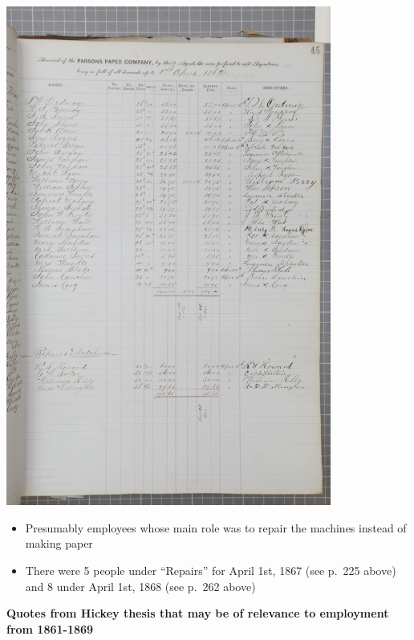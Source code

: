 \documentclass[
  letterpaper,
  DIV=11,
  numbers=noendperiod]{scrartcl}
\begin{document}
\begin{itemize}
  \includegraphics[width=4.20833in,height=\textheight]{images/Screenshot 2023-02-13 at 4.18.46 PM.png}

  \begin{itemize}
  \item
    Presumably employees whose main role was to repair the machines
    instead of making paper
  \item
    There were 5 people under ``Repairs'' for April 1st, 1867 (see
    p.~225 above) and 8 under April 1st, 1868 (see p.~262 above)
  \end{itemize}
\end{itemize}

\textbf{Quotes from Hickey thesis that may be of relevance to employment
from 1861-1869}
\end{document}

